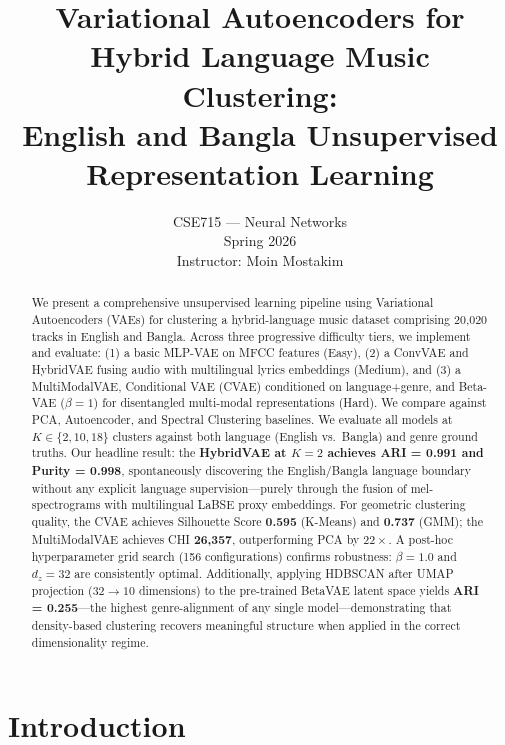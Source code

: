\documentclass{article}
\title{Variational Autoencoders for Hybrid Language Music Clustering:\\
English and Bangla Unsupervised Representation Learning}
\author{%
  CSE715 --- Neural Networks\\
  Spring 2026\\
  Instructor: Moin Mostakim\\
}
\begin{document}
\graphicspath{{figures/}}

\maketitle

\begin{abstract}
We present a comprehensive unsupervised learning pipeline using Variational Autoencoders (VAEs) for clustering a hybrid-language music dataset comprising 20,020 tracks in English and Bangla. Across three progressive difficulty tiers, we implement and evaluate: (1) a basic MLP-VAE on MFCC features (Easy), (2) a ConvVAE and HybridVAE fusing audio with multilingual lyrics embeddings (Medium), and (3) a MultiModalVAE, Conditional VAE (CVAE) conditioned on language+genre, and Beta-VAE ($\beta\!=\!1$) for disentangled multi-modal representations (Hard). We compare against PCA, Autoencoder, and Spectral Clustering baselines. We evaluate all models at $K\!\in\!\{2,10,18\}$ clusters against both language (English vs.\ Bangla) and genre ground truths. Our headline result: the \textbf{HybridVAE at $K\!=\!2$ achieves ARI = 0.991 and Purity = 0.998}, spontaneously discovering the English/Bangla language boundary without any explicit language supervision---purely through the fusion of mel-spectrograms with multilingual LaBSE proxy embeddings. For geometric clustering quality, the CVAE achieves Silhouette Score \textbf{0.595} (K-Means) and \textbf{0.737} (GMM); the MultiModalVAE achieves CHI \textbf{26,357}, outperforming PCA by $22\times$. A post-hoc hyperparameter grid search (156 configurations) confirms robustness: $\beta\!=\!1.0$ and $d_z\!=\!32$ are consistently optimal. Additionally, applying HDBSCAN after UMAP projection ($32\!\to\!10$ dimensions) to the pre-trained BetaVAE latent space yields \textbf{ARI = 0.255}---the highest genre-alignment of any single model---demonstrating that density-based clustering recovers meaningful structure when applied in the correct dimensionality regime.
\end{abstract}

\section{Introduction}
\end{document}
